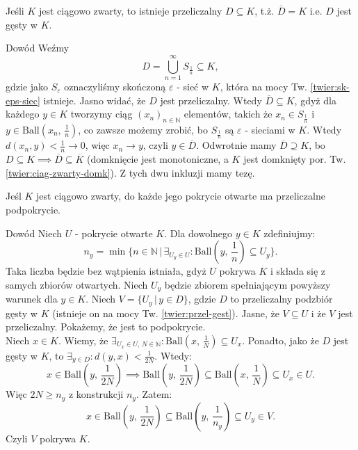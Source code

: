 \documentclass{article}
\newcounter{defi}
\numberwithin{defi}{section}
\numberwithin{defi}{section}
\newcommand{\N}{\mathbb{N}}
\newcommand{\oo}{\infty}
\providecommand{\eps}{\varepsilon}
\newcommand{\ciag}[1]{(#1_{n})_{n \in \N}}
\newcommand{\ball}[2]{\text{Ball}(#1, \, #2)}
\begin{document}
    \begin{twier}{} \label{twier:przel-gest}
        Jeśli $K$ jest ciągowo zwarty, to istnieje przeliczalny $D \subseteq K$, t.ż. $\overline{D} = K$ i.e. $D$ jest gęsty w $K$.
    \end{twier}

    \begin{dow}{Dowód}
        Weźmy \begin{equation*}
            D = \bigcup_{n = 1}^{\oo} S_{\frac{1}{n}} \subseteq K,
        \end{equation*} gdzie jako $S_\eps$ oznaczyliśmy skończoną $\eps$ - sieć w $K$, która na mocy Tw. \ref{twier:sk-eps-siec} istnieje. Jasno widać, że $D$ jest przeliczalny. Wtedy $\overline{D} \subseteq K$, gdyż dla każdego $y \in K$ tworzymy ciąg $\ciag{x}$ elementów, takich że $x_n \in S_{\frac{1}{n}}$ i $y \in \ball{x_n}{\frac{1}{n}}$, co zawsze możemy zrobić, bo $S_\frac{1}{n}$ są $\eps$ - sieciami w $K$. Wtedy $d(x_n, y) < \frac{1}{n} \to 0$, więc $x_n \to y$, czyli $y 
        \in \overline{D}$. Odwrotnie mamy $\overline{D} \supseteq K$, bo $D \subseteq K \implies \overline{D} \subseteq \overline{K}$ (domknięcie jest monotoniczne, a $K$ jest domknięty por. Tw. \ref{twier:ciag-zwarty-domk}). Z tych dwu inkluzji mamy tezę. 
    \end{dow}



    \begin{twier}{} \label{twier:przel_podpokr}
        Jeśl $K$ jest ciągowo zwarty, do każde jego pokrycie otwarte ma przeliczalne podpokrycie. 
    \end{twier}

    \begin{dow}{Dowód}
        Niech $U$ - pokrycie otwarte $K$. Dla dowolnego $y \in K$ zdefiniujmy:\begin{equation*}
            n_y = \min\{ n \in \N \, | \, \exists_{U_y \in U}: \ball{y}{\frac{1}{n}} \subseteq U_y \}.
        \end{equation*}  Taka liczba będzie bez wątpienia istniała, gdyż $U$ pokrywa $K$ i składa się z samych zbiorów otwartych. Niech $U_y$ będzie zbiorem spełniającym powyższy warunek dla $y \in K$. Niech $V = \{ U_y \, | \, y \in D \}$, gdzie $D$ to przeliczalny podzbiór gęsty w $K$ (istnieje on na mocy Tw. \ref{twier:przel-gest}). Jasne, że $V \subseteq U$ i że $V$ jest przeliczalny. Pokażemy, że jest to podpokrycie. \\ 
        Niech $x \in K$. Wiemy, że $\exists_{U_x \in U, \, N \in \N}: \ball{x}{\frac{1}{N}} \subseteq U_x$. Ponadto, jako że $D$ jest gęsty w $K$, to $\exists_{y \in D}: d(y, x) < \frac{1}{2N}$. Wtedy: \begin{equation*}
            x \in \ball{y}{\frac{1}{2N}} \implies \ball{y}{\frac{1}{2N}} \subseteq \ball{x}{\frac{1}{N}} \subseteq U_x \in U.
        \end{equation*} Więc $2N \geqslant n_y$ z konstrukcji $n_y$. Zatem: \begin{equation*}
            x \in \ball{y}{\frac{1}{2N}} \subseteq \ball{y}{\frac{1}{n_y}} \subseteq U_y \in V.
        \end{equation*} Czyli $V$ pokrywa $K$.
    \end{dow}
\end{document}
